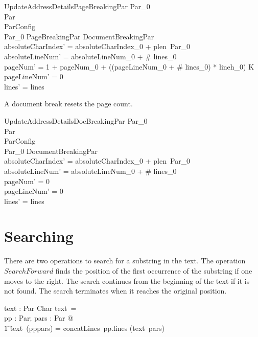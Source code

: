 \documentclass{article}
\begin{document}
\begin{schema}{UpdateAddressDetailsPageBreakingPar}
	Par_0 \\
	\Delta Par \\
	\Xi ParConfig \\
\where
	\theta Par_0 \in PageBreakingPar \setminus DocumentBreakingPar \\
	absoluteCharIndex' = absoluteCharIndex_0 + plen~\theta Par_0 \\
	absoluteLineNum' = absoluteLineNum_0 + \# lines_0 \\
	pageNum' = 1 + pageNum_0 + ((pageLineNum_0 + \# lines_0) * lineh_0) \div K \\
	pageLineNum' = 0 \\
	lines' = lines \\
\end{schema}

A document break resets the page count.

\begin{schema}{UpdateAddressDetailsDocBreakingPar}
	Par_0 \\
	\Delta Par \\
	\Xi ParConfig \\
\where
	\theta Par_0 \in DocumentBreakingPar \\
	absoluteCharIndex' = absoluteCharIndex_0 + plen~\theta Par_0 \\
	absoluteLineNum' = absoluteLineNum_0 + \# lines_0 \\
	pageNum' = 0 \\
	pageLineNum' = 0 \\
	lines' = lines \\
\end{schema}

\section{Searching}

There are two operations to search for a substring in the text. The operation $SearchForward$ finds the position of the first occurrence of the substring if one moves to the right. The search continues from the beginning of the text if it is not found. The search terminates when it reaches the original position. 


\begin{axdef}
	text : \seq Par \fun \seq Char
\where
	text~\langle\rangle = \langle\rangle \\
	\forall pp : Par; pars : \seq Par @ \\
	\t1 text~(\langle pp\rangle \cat pars) = concatLines~pp.lines \cat (text~pars) 
\end{axdef}
\end{document}

